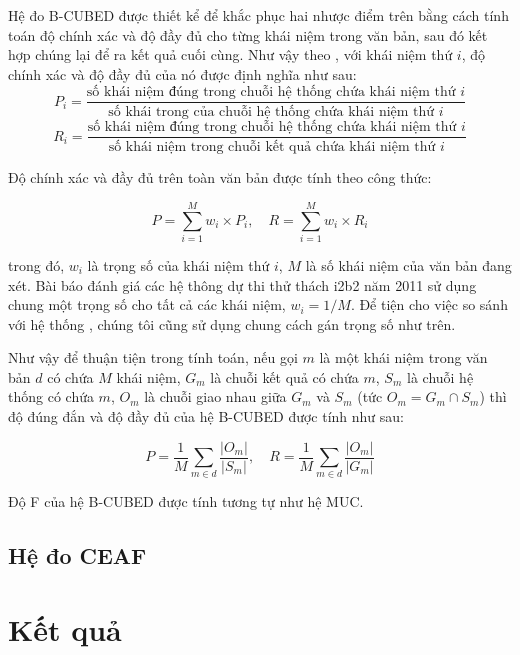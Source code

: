 Hệ đo B-CUBED được thiết kể để khắc phục hai nhược điểm trên bằng cách tính toán độ chính xác và độ đầy đủ cho từng khái niệm trong văn bản, sau đó kết hợp chúng lại để ra kết quả cuối cùng. Như vậy theo \cite{AmitBagga1998}, với khái niệm thứ $i$, độ chính xác và độ đầy đủ của nó được định nghĩa như sau:
\[P_i=\frac{\text{số khái niệm đúng trong chuỗi hệ thống chứa khái niệm thứ $i$}}{\text{số khái trong của chuỗi hệ thống chứa khái niệm thứ $i$}}\]
\[R_i=\frac{\text{số khái niệm đúng trong chuỗi hệ thống chứa khái niệm thứ $i$}}{\text{số khái niệm trong chuỗi kết quả chứa khái niệm thứ $i$}}\]

Độ chính xác và đầy đủ trên toàn văn bản được tính theo công thức:

\[P=\sum_{i=1}^{M} w_i \times P_i,\quad R=\sum_{i=1}^{M} w_i\times R_i\]

\noindent trong đó, $w_i$ là trọng số của khái niệm thứ $i$, $M$ là số khái niệm của văn bản đang xét. Bài báo đánh giá các hệ thông dự thi thử thách i2b2 năm 2011 sử dụng chung một trọng số cho tất cả các khái niệm, $w_i=1/M$. Để tiện cho việc so sánh với hệ thống \cite{YanXu2012}, chúng tôi cũng sử dụng chung cách gán trọng số như trên.

Như vậy để thuận tiện trong tính toán, nếu gọi $m$ là một khái niệm trong văn bản $d$ có chứa $M$ khái niệm, $G_m$ là chuỗi kết quả có chứa $m$, $S_m$ là chuỗi hệ thống có chứa $m$, $O_m$ là chuỗi giao nhau giữa $G_m$ và $S_m$ (tức $O_m=G_m\cap S_m$) thì độ đúng đắn và độ đầy đủ của hệ B-CUBED được tính như sau:

\[P=\frac{1}{M}\sum_{m\in d}\frac{|O_m|}{|S_m|},\quad R=\frac{1}{M}\sum_{m\in d}\frac{|O_m|}{|G_m|}\]

Độ F của hệ B-CUBED được tính tương tự như hệ MUC.

\subsection*{Hệ đo CEAF}


\section{Kết quả}
